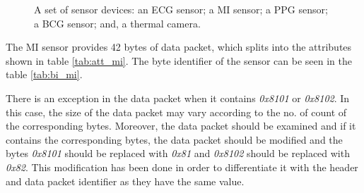 \begin{figure}
	\hspace{8pt}%
	\caption[A set of four subfigures.]{A set of sensor devices:
		 an ECG sensor;
		 a MI sensor;
		 a PPG sensor;
		 a BCG sensor; and,
		 a thermal camera.}%
	\label{fig:ex3}%
\end{figure}



The MI sensor provides 42 bytes of data packet, which splits into the attributes shown in table \ref{tab:att_mi}. The byte identifier of the sensor can be seen in the table \ref{tab:bi_mi}.

There is an exception in the data packet when it contains \textit{0x8101} or \textit{0x8102}. In this case, the size of the data packet may vary according to the no. of count of the corresponding bytes. Moreover, the data packet should be examined and if it contains the corresponding bytes, the data packet should be modified and the bytes \textit{0x8101} should be replaced with \textit{0x81} and \textit{0x8102} should be replaced with \textit{0x82}. This modification has been done in order to differentiate it with the header and data packet identifier as they have the same value.


